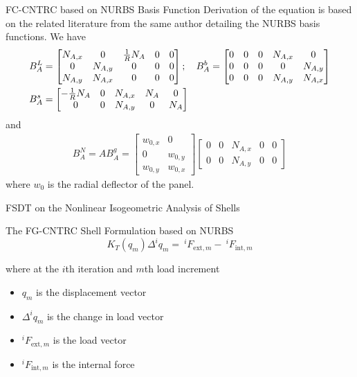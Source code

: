 \documentclass[
10pt,
aspectratio=169,
]{beamer}
\begin{document}
\begin{frame}{FC-CNTRC based on NURBS Basis Function}
    Derivation of the equation is based on the related literature from the same author detailing the NURBS basis functions. We have
    \pause 
    \begin{align*}
        B_A^L &= \begin{bmatrix}
            N_{A,x} & 0 & \frac{1}{R}N_A & 0 & 0 \\ 
            0 & N_{A,y} & 0 & 0 & 0 \\
            N_{A,y} & N_{A,x} & 0 & 0 & 0 \\
        \end{bmatrix};\quad 
        B_A^b = \begin{bmatrix}
            0 & 0 & 0 & N_{A,x} & 0 \\
            0 & 0 & 0 & 0 & N_{A,y} \\ 
            0 & 0 & 0 & N_{A,y} & N_{A,x}
        \end{bmatrix}
        \\\vspace{0.1in}
        B_A^s &= \begin{bmatrix}
            -\frac{1}{R}N_A & 0 & N_{A,x} & N_A & 0 \\ 
            0 & 0 & N_{A,y} & 0 & N_A
        \end{bmatrix}
    \end{align*}
    \pause
    and
    \begin{align*}
        B_A^N = AB_A^g = \begin{bmatrix}
            w_{0,x} & 0 \\
            0 & w_{0,y} \\ 
            w_{0,y} & w_{0,x}
        \end{bmatrix}
        \begin{bmatrix}
            0 & 0 & N_{A,x} & 0 & 0 \\
            0 & 0 & N_{A,y} & 0 & 0
        \end{bmatrix}
    \end{align*}
    where \(w_0\) is the radial deflector of the panel. 
\end{frame}
\begin{frame}{FSDT on the Nonlinear Isogeometric Analysis of Shells}
    \begin{block}{The FG-CNTRC Shell Formulation based on NURBS}
        $$K_T(q_m)\Delta^iq_m =\:^iF_{\text{ext},m} -\: ^iF_{\text{int},m}$$
    \end{block}
    where at the \(i\)th iteration and \(m\)th load increment
    \begin{itemize}
        \item \(q_m\) is the displacement vector \pause
        \item \(\Delta^iq_m\) is the change in load vector \pause
        \item \(^iF_{\text{ext},m}\) is the load vector \pause
        \item \(^iF_{\text{int},m}\) is the internal force
    \end{itemize}
\end{frame}
\end{document}
